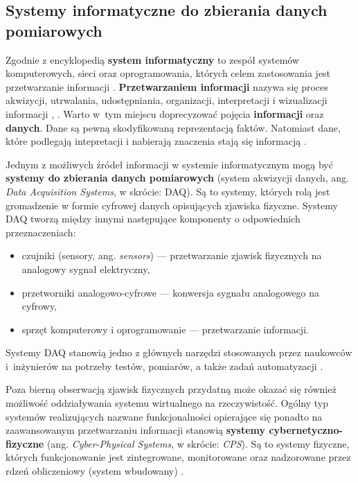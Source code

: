 \documentclass[a4paper, 12pt, twoside]{article}
\begin{document}
\subsection{Systemy informatyczne do zbierania danych pomiarowych} \label{system-do-zbierania-danych}

Zgodnie z encyklopedią \textbf{system informatyczny} to zespół systemów komputerowych,
sieci oraz oprogramowania, których celem zastosowania jest
przetwarzanie informacji \cite{system-informatyczny}.
\textbf{Przetwarzaniem informacji} nazywa się proces akwizycji, utrwalania, udostępniania,
organizacji, interpretacji i wizualizacji informacji \cite{information-science},
\cite{information-processing}. Warto w~tym miejscu doprecyzować pojęcia
\textbf{informacji} oraz \textbf{danych}. Dane są pewną skodyfikowaną reprezentacją
faktów. Natomiast dane, które podlegają intepretacji i nabierają znaczenia
stają się informacją \cite{dane-informacja-wiedza}.

Jednym z możliwych źródeł informacji w systemie informatycznym mogą być
\textbf{systemy do zbierania danych pomiarowych} (system akwizycji danych, ang. \emph{Data Acquisition Systems}, w skrócie: DAQ).
Są to systemy, których rolą jest gromadzenie w formie cyfrowej danych opisujących
zjawiska fizyczne. Systemy DAQ tworzą między innymi następujące komponenty
o odpowiednich przeznaczeniach:
\begin{itemize}
    \itemsep0em
    \item czujniki (sensory, ang. \emph{sensors}) --- przetwarzanie zjawisk fizycznych na analogowy sygnał elektryczny,
    \item przetworniki analogowo-cyfrowe --- konwersja sygnału analogowego na cyfrowy,
    \item sprzęt komputerowy i oprogramowanie --- przetwarzanie informacji.
\end{itemize}
Systemy DAQ stanowią jedno z głównych narzędzi stosowanych przez naukowców i~inżynierów
na potrzeby testów, pomiarów, a także zadań automatyzacji \cite{data-aq-systems}.

Poza bierną obserwacją zjawisk fizycznych przydatną może okazać się również
możliwość oddziaływania systemu wirtualnego na rzeczywistość. Ogólny typ systemów
realizujących nazwane funkcjonalności opierające się ponadto na zaawansowanym przetwarzaniu informacji
stanowią \textbf{systemy cybernetyczno-fizyczne}
(ang. \emph{Cyber-Physical Systems}, w skrócie: \emph{CPS}).
Są to systemy fizyczne, których funkcjonowanie jest zintegrowane, monitorowane oraz
nadzorowane przez rdzeń obliczeniowy (system wbudowany) \cite{iiot-cyber-manufacturing-systems}.
\end{document}
